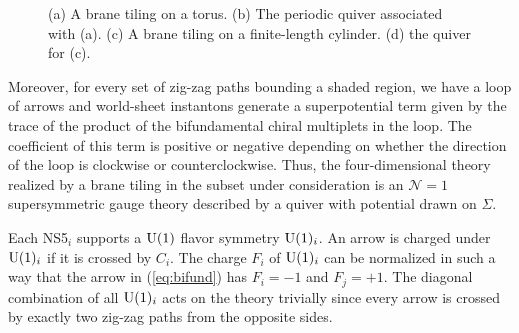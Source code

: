 \begin{figure}
{
      }
    \caption{(a) A brane tiling on a torus. (b) The periodic quiver associated with (a).
    (c) A brane tiling on a finite-length cylinder. (d) the quiver for (c).}
    \label{fig:tilings_quiverdiagram}
  \end{figure}


Moreover, for every set of zig-zag paths bounding a shaded region,
we have a loop of arrows and world-sheet instantons generate a superpotential
term given by the trace of the product of the bifundamental chiral
multiplets in the loop. The coefficient of this term is positive or
negative depending on whether the direction of the loop is clockwise
or counterclockwise. Thus, the four-dimensional theory realized by
a brane tiling in the subset under consideration is an $\mathcal{N}=1$
supersymmetric gauge theory described by a quiver with potential drawn
on $\Sigma$.

Each NS5$_{i}$ supports a $\mathrm{U}(1)$ flavor symmetry $\mathrm{U}(1)_{i}$. An
arrow is charged under $\mathrm{U}(1)_{i}$ if it is crossed by $C_{i}$. The
charge $F_{i}$ of $\mathrm{U}(1)_{i}$ can be normalized in such a way that
the arrow in (\ref{eq:bifund}) has $F_{i}=-1$ and $F_{j}=+1$. The
diagonal combination of all $\mathrm{U}(1)_{i}$ acts on the theory trivially
since every arrow is crossed by exactly two zig-zag paths from the
opposite sides.

